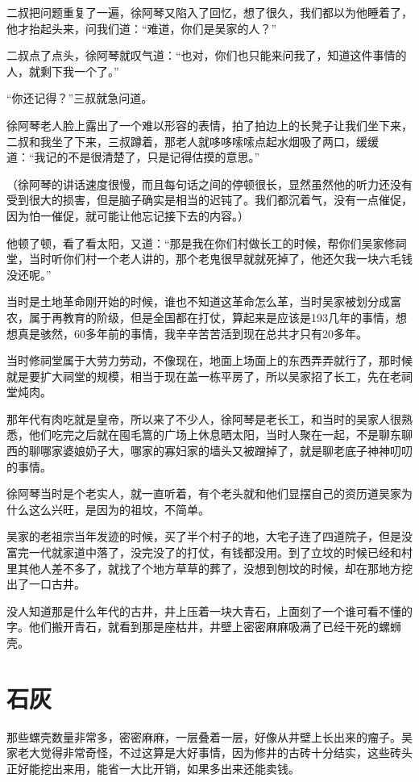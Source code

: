 二叔把问题重复了一遍，徐阿琴又陷入了回忆，想了很久，我们都以为他睡着了，他才抬起头来，问我们道：“难道，你们是吴家的人？”

二叔点了点头，徐阿琴就叹气道：“也对，你们也只能来问我了，知道这件事情的人，就剩下我一个了。”

“你还记得？”三叔就急问道。

徐阿琴老人脸上露出了一个难以形容的表情，拍了拍边上的长凳子让我们坐下来，二叔和我坐了下来，三叔蹲着，那老人就哆哆嗦嗦点起水烟吸了两口，缓缓道：“我记的不是很清楚了，只是记得估摸的意思。”

（徐阿琴的讲话速度很慢，而且每句话之间的停顿很长，显然虽然他的听力还没有受到很大的损害，但是脑子确实是相当的迟钝了。我们都沉着气，没有一点催促，因为怕一催促，就可能让他忘记接下去的内容。）

他顿了顿，看了看太阳，又道：“那是我在你们村做长工的时候，帮你们吴家修祠堂，当时听你们村一个老人讲的，那个老鬼很早就就死掉了，他还欠我一块六毛钱没还呢。”

当时是土地革命刚开始的时候，谁也不知道这革命怎么革，当时吴家被划分成富农，属于再教育的阶级，但是全国都在打仗，算起来是应该是193几年的事情，想想真是骇然，60多年前的事情，我辛辛苦苦活到现在总共才只有20多年。

当时修祠堂属于大劳力劳动，不像现在，地面上场面上的东西弄弄就行了，那时候就是要扩大祠堂的规模，相当于现在盖一栋平房了，所以吴家招了长工，先在老祠堂炖肉。

那年代有肉吃就是皇帝，所以来了不少人，徐阿琴是老长工，和当时的吴家人很熟悉，他们吃完之后就在囤毛篙的广场上休息晒太阳，当时人聚在一起，不是聊东聊西的聊哪家婆娘奶子大，哪家的寡妇家的墙头又被蹭掉了，就是聊老底子神神叨叨的事情。

徐阿琴当时是个老实人，就一直听着，有个老头就和他们显摆自己的资历道吴家为什么这么兴旺，是因为的祖坟，不简单。

吴家的老祖宗当年发迹的时候，买了半个村子的地，大宅子连了四道院子，但是没富完一代就家道中落了，没完没了的打仗，有钱都没用。到了立坟的时候已经和村里其他人差不多了，就找了个地方草草的葬了，没想到刨坟的时候，却在那地方挖出了一口古井。

没人知道那是什么年代的古井，井上压着一块大青石，上面刻了一个谁可看不懂的字。他们搬开青石，就看到那是座枯井，井壁上密密麻麻吸满了已经干死的螺蛳壳。

\chapter{石灰}

那些螺壳数量非常多，密密麻麻，一层叠着一层，好像从井壁上长出来的瘤子。吴家老大觉得非常奇怪，不过这算是大好事情，因为修井的古砖十分结实，这些砖头正好能挖出来用，能省一大比开销，如果多出来还能卖钱。

